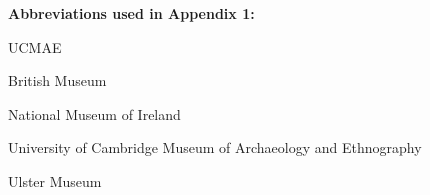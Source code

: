 \textbf{\sffamily Abbreviations used in Appendix 1:} 
	\begin{labeling}{UCMAE}\setlength{\itemsep}{0pt}\setlength{\parskip}{0pt}\setlength{\parsep}{0pt}%
		\item[BM] British Museum
		\item[NMI]		National Museum of Ireland
		\item[UCMAE]	University of Cambridge Museum of Archaeology and Ethnography
		\item[UM]		Ulster Museum
	\end{labeling}
 


\printbibliography[heading=subbibnumbered] 

\label{hughes:lastpage}
\closingarticle